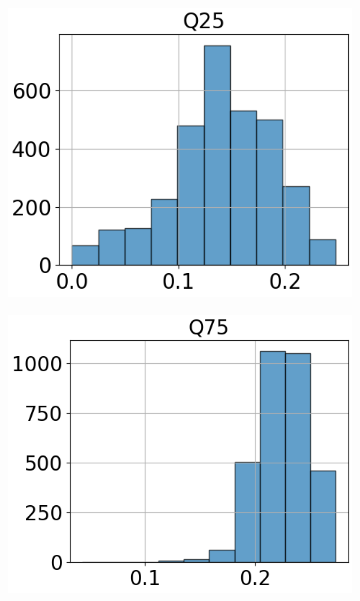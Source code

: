 \begin{figure}[htbp]
\begin{subfigure}[t]{.24\textwidth}
        \includegraphics[width=\linewidth]{../../python_code/plots/logistic_regression/histogram-Q25.png}
    \end{subfigure}
    \begin{subfigure}[t]{.24\textwidth}
        \centering 
        \includegraphics[width=\linewidth]{../../python_code/plots/logistic_regression/histogram-Q75.png}
    \end{subfigure}
    \begin{subfigure}[t]{.24\textwidth}
        \centering 

\end{subfigure}
\end{figure}

